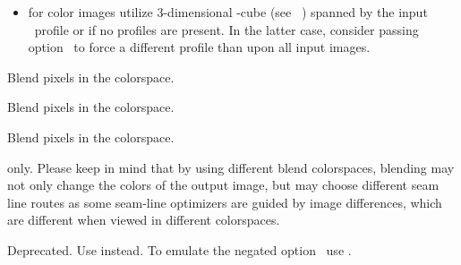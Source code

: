 \begin{codelist}
\begin{description}
\begin{itemize}
    \item
      for color images utilize 3-dimensional -cube (see
      \equationabbr~) spanned by the input ~profile
      or  if no profiles are present.  In the latter case, consider passing
      option~ to force a
      different profile than  upon all input images.
    \end{itemize}

  \item[\itempar{\code{lab} \\ \code{cielab} \\ \code{lstar} \\ \code{l-star}}]\itemend
    Blend pixels in the  colorspace.

  \item[\itempar{\code{luv} \\ \code{cieluv}}]\itemend
    Blend pixels in the  colorspace.

  \item[\itempar{\code{ciecam} \\ \code{ciecam02} \\ \code{jch}}]\itemend
    Blend pixels in the  colorspace.
  \end{description}

  \ifenblend
    \begin{restrictedmaterial}{ only.}
      Please keep in mind that by using different blend colorspaces,
      blending may not only change the colors of the output image, but  may
      choose different seam line routes as some seam-line optimizers are guided by image
      differences, which are different when viewed in different colorspaces.
    \end{restrictedmaterial}
  \fi


  \label{opt-ciecam}%
\item[\itempar{-c \\ --ciecam}]\itemend
  Deprecated.  Use  instead.  To emulate the negated
  option~ use .


\end{codelist}
